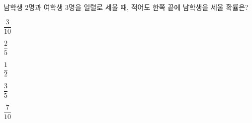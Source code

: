 남학생 $2$명과 여학생 $3$명을 일렬로 세울 때, 적어도 한쪽 끝에 남학생을 세울 확률은?
\begin{choices32}{\rule[-3ex]{0pt}{8ex}$\dfrac{3}{10}$}{\rule[-3ex]{0pt}{8ex}$\dfrac{2}{5}$}{\rule[-3ex]{0pt}{8ex}$\dfrac{1}{2}$}{\rule[-3ex]{0pt}{8ex}$\dfrac{3}{5}$}{\rule[-3ex]{0pt}{8ex}$\dfrac{7}{10}$}\end{choices32}

